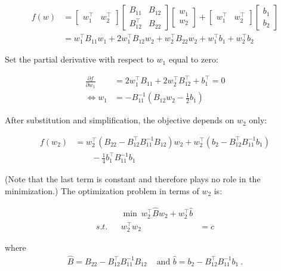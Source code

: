 \documentclass[conference]{IEEEtran}
\begin{document}
\begin{align*} f(w) &=
\begin{bmatrix} w_1^\top & w_2^\top \end{bmatrix}
\begin{bmatrix} B_{11} & B_{12} \\ B_{12}^\top & B_{22}\end{bmatrix}
\begin{bmatrix} w_1 \\ w_2 \end{bmatrix} + 
\begin{bmatrix} w_1^\top & w_2^\top \end{bmatrix}
\begin{bmatrix} b_1 \\ b_2\end{bmatrix} \\
&=
w_1^\top B_{11}w_1 + 2w_1^\top B_{12}w_2 + w_2^\top B_{22}w_2 + w_1^\top b_1 + w_2^\top b_2
\end{align*}

Set the partial derivative with respect to $w_1$ equal to zero:

\begin{align}
\nonumber \frac{\partial f}{\partial w_1} &= 2w_1^\top B_{11} + 2w_2^\top B_{12}^\top + b_1^\top = 0 \\
\iff w_1 &= -B_{11}^{-1}\left(B_{12}w_2 - \frac{1}{2}b_1 \right)
\end{align}

After substitution and simplification, the objective depends on $w_2$ only:

\begin{align*}
f(w_2) &= w_2^\top\left(B_{22} - B_{12}^\top B_{11}^{-1} B_{12}\right)w_2 + 
w_2^\top (b_2 - B_{12}^\top B_{11}^{-1}b_1) \\
&\qquad - \frac{1}{4}b_1^\top B_{11}^{-1}b_1
\end{align*}

(Note that the last term is constant and therefore plays no role in the
minimization.) The optimization problem in terms of $w_2$ is:

\begin{subequations}\label{opt5}
\begin{align}
&& \min~ w_2^\top \hat{B}w_2 + w_2^\top \hat{b} \\
\label{opt5:quad} s.t. && w_2^\top w_2 &= c
\end{align}
\end{subequations}

where
\begin{align*}
\hat{B} = B_{22} - B_{12}^\top B_{11}^{-1}B_{12} &\text{ and }\hat{b} = b_2 - B_{12}^\top B_{11}^{-1}b_1~.
\end{align*}
\end{document}
